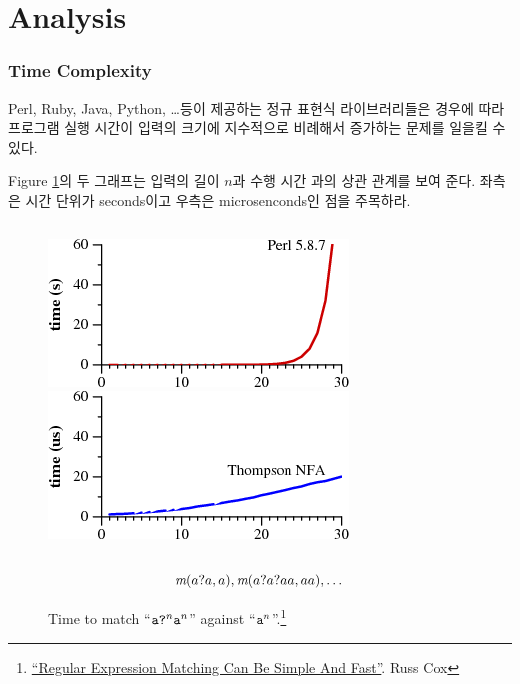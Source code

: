 \section{Analysis}

\begin{frame}
\frametitle{Time Complexity}

Perl, Ruby, Java, Python, \dots 등이 제공하는 정규 표현식 라이브러리들은 
경우에 따라 프로그램 실행 시간이 입력의 
크기에 지수적으로 비례해서 증가하는 문제를 일을킬 수 있다. 

Figure \ref{fig:graph}의 두 그래프는 입력의 길이 $n$과 수행 시간 과의 
상관 관계를 보여 준다. 좌측은 시간 단위가 seconds이고 우측은 
microsenconds인 점을 주목하라.

\begin{figure}
\begin{columns}[b]
    \column{.45\paperwidth}
        \includegraphics[width=.35\paperwidth]{grep3p.png}
    \column{.45\paperwidth}
        \includegraphics[width=.35\paperwidth]{grep4p.png}
\end{columns}
\[
    \rmatch{a}{a?a},  \rmatch{aa}{a?a?aa}, \dots 
\]
\caption{Time to match ``$\mbtt{a?}^n\mbtt{a}^n$'' against
``$\mbtt{a}^n$''.\footnote{\href{http://swtch.com/~rsc/regexp/regexp1.html}{``Regular Expression
    Matching Can Be Simple And Fast''}. Russ Cox}}
\label{fig:graph}
\end{figure}


\end{frame}

